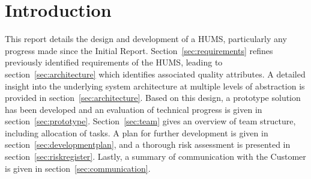 \section{Introduction}
\label{sec:introduction}

This report details the design and development of a HUMS, particularly any progress made since the Initial Report. Section~\ref{sec:requirements} refines previously identified requirements of the HUMS, leading to section~\ref{sec:architecture} which identifies associated quality attributes. A detailed insight into the underlying system architecture at multiple levels of abstraction is provided in section~\ref{sec:architecture}. Based on this design, a prototype solution has been developed and an evaluation of technical progress is given in section~\ref{sec:prototype}. Section~\ref{sec:team} gives an overview of team structure, including allocation of tasks. A plan for further development is given in section~\ref{sec:developmentplan}, and a thorough risk assessment is presented in section~\ref{sec:riskregister}. Lastly, a summary of communication with the Customer is given in section~\ref{sec:communication}.
